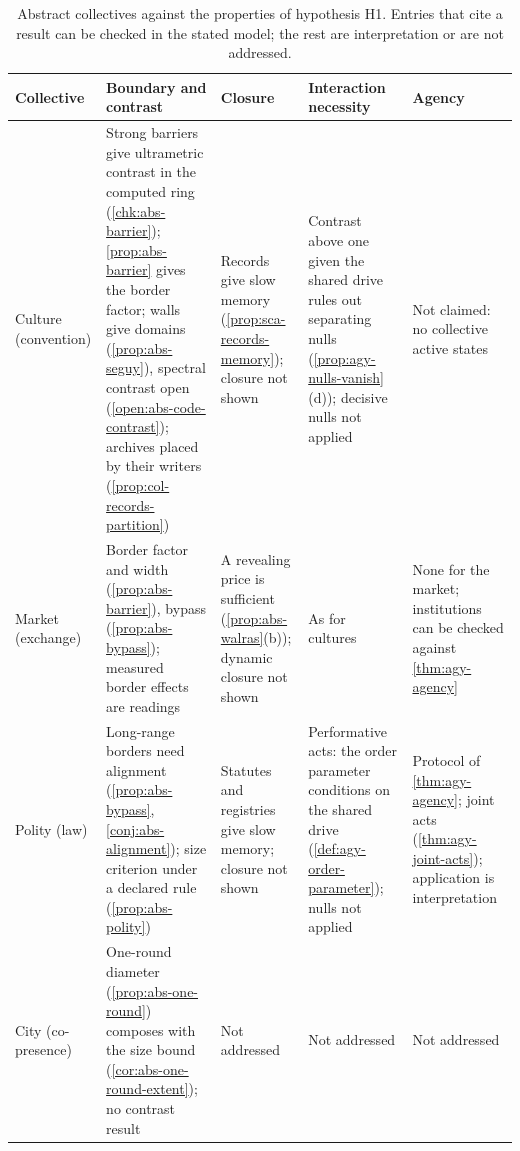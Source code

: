 \begin{table}[t]
\centering\small
\caption{Abstract collectives against the properties of hypothesis H1. Entries that cite a result can be checked in the stated model; the rest are interpretation or are not addressed.}
\label{tab:abs-graded}
\begin{tabular}{@{}>{\raggedright\arraybackslash}p{}>{\raggedright\arraybackslash}p{}>{\raggedright\arraybackslash}p{}>{\raggedright\arraybackslash}p{}>{\raggedright\arraybackslash}p{}@{}}
\toprule
Collective & Boundary and contrast & Closure & Interaction necessity & Agency\\
\midrule
Culture (convention) & Strong barriers give ultrametric contrast in the computed ring (\cref{chk:abs-barrier}); \cref{prop:abs-barrier} gives the border factor; walls give domains (\cref{prop:abs-seguy}), spectral contrast open (\cref{open:abs-code-contrast}); archives placed by their writers (\cref{prop:col-records-partition}) & Records give slow memory (\cref{prop:sca-records-memory}); closure not shown & Contrast above one given the shared drive rules out separating nulls (\cref{prop:agy-nulls-vanish}(d)); decisive nulls not applied & Not claimed: no collective active states\\
Market (exchange) & Border factor and width (\cref{prop:abs-barrier}), bypass (\cref{prop:abs-bypass}); measured border effects are readings & A revealing price is sufficient (\cref{prop:abs-walras}(b)); dynamic closure not shown & As for cultures & None for the market; institutions can be checked against \cref{thm:agy-agency}\\
Polity (law) & Long-range borders need alignment (\cref{prop:abs-bypass}, \cref{conj:abs-alignment}); size criterion under a declared rule (\cref{prop:abs-polity}) & Statutes and registries give slow memory; closure not shown & Performative acts: the order parameter conditions on the shared drive (\cref{def:agy-order-parameter}); nulls not applied & Protocol of \cref{thm:agy-agency}; joint acts (\cref{thm:agy-joint-acts}); application is interpretation\\
City (co-presence) & One-round diameter (\cref{prop:abs-one-round}) composes with the size bound (\cref{cor:abs-one-round-extent}); no contrast result & Not addressed & Not addressed & Not addressed\\
\bottomrule
\end{tabular}
\end{table}

